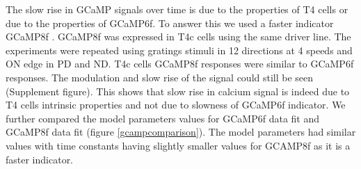 \documentclass[9pt,lineno]{elife}
\begin{document}
The slow rise in GCaMP signals over time is due to the properties of T4 cells or due to the properties of GCaMP6f. To answer this we used a faster indicator GCaMP8f \parencite{Zhang2020}. GCaMP8f was expressed in T4c cells using the same driver line. The experiments were repeated using gratings stimuli in 12 directions at 4 speeds and ON edge in PD and ND. T4c cells GCaMP8f responses were similar to GCaMP6f responses. The modulation and slow rise of the signal could still be seen (Supplement figure). This shows that slow rise in calcium signal is indeed due to T4 cells intrinsic properties and not due to slowness of GCaMP6f indicator. We further compared the model parameters values for GCaMP6f data fit and GCaMP8f data fit (figure \ref{gcampcomparison}). The model parameters had similar values with time constants having slightly smaller values for GCAMP8f as it is a faster indicator.

     
\end{document}
